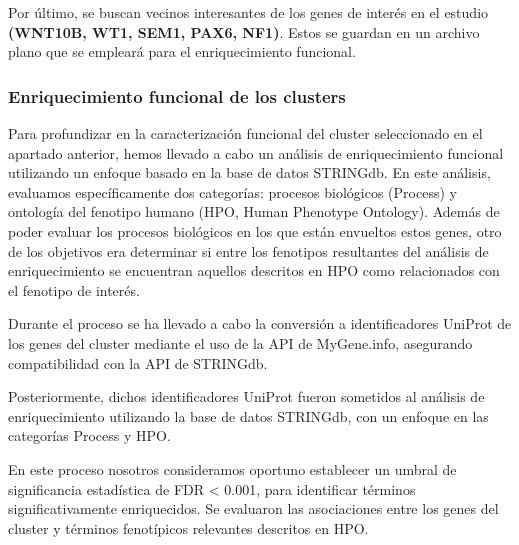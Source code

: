Por último, se buscan vecinos interesantes de los genes de interés en el estudio \textbf{(WNT10B, WT1, SEM1, PAX6, NF1)}. Estos se guardan en un archivo plano que se empleará para el enriquecimiento funcional.

\subsubsection{Enriquecimiento funcional de los clusters}


Para profundizar en la caracterización funcional del cluster seleccionado en el apartado anterior, hemos llevado a cabo un análisis de enriquecimiento funcional utilizando un enfoque basado en la base de datos STRINGdb. En este análisis, evaluamos específicamente dos categorías: procesos biológicos (Process) y ontología del fenotipo humano (HPO, Human Phenotype Ontology). Además de poder evaluar los procesos biológicos en los que están envueltos estos genes, otro de los objetivos era determinar si entre los fenotipos resultantes del análisis de enriquecimiento se encuentran aquellos descritos en HPO como relacionados con el fenotipo de interés.

Durante el proceso se ha llevado a cabo la conversión a identificadores UniProt de los genes del cluster mediante el uso de la API de MyGene.info, asegurando compatibilidad con la API de STRINGdb.

Posteriormente, dichos identificadores UniProt fueron sometidos al análisis de enriquecimiento utilizando la base de datos STRINGdb, con un enfoque en las categorías Process y HPO. 

En este proceso nosotros consideramos oportuno establecer un umbral de significancia estadística de FDR < 0.001, para identificar términos significativamente enriquecidos.
Se evaluaron las asociaciones entre los genes del cluster y términos fenotípicos relevantes descritos en HPO.

